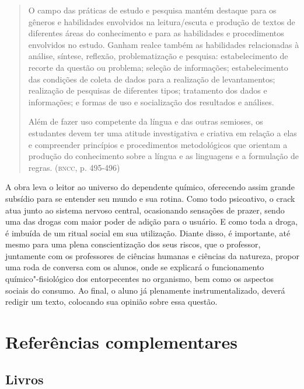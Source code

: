 \documentclass{article}
\begin{document}
\begin{quote}
O campo das práticas de estudo e pesquisa mantém destaque para os
gêneros e habilidades envolvidos na leitura/escuta e produção de textos
de diferentes áreas do conhecimento e para as habilidades e
procedimentos envolvidos no estudo. Ganham realce também as habilidades
relacionadas à análise, síntese, reflexão, problematização e pesquisa:
estabelecimento de recorte da questão ou problema; seleção de
informações; estabelecimento das condições de coleta de dados para a
realização de levantamentos; realização de pesquisas de diferentes
tipos; tratamento dos dados e informações; e formas de uso e
socialização dos resultados e análises.

Além de fazer uso competente da língua e das outras semioses, os
estudantes devem ter uma atitude investigativa e criativa em relação a
elas e compreender princípios e procedimentos metodológicos que orientam
a produção do conhecimento sobre a língua e as linguagens e a formulação
de regras. (\textsc{bncc}, p. 495-496)
\end{quote}

A obra leva o leitor ao universo do dependente químico, oferecendo
assim grande subsídio para se entender seu mundo e sua rotina. Como
todo psicoativo, o crack atua junto ao sistema nervoso central,
ocasionando sensações de prazer, sendo uma das drogas com maior poder
de adição para o usuário. E como toda a droga, é imbuída de um ritual
social em sua utilização. Diante disso, é importante, até mesmo para
uma plena conscientização dos seus riscos, que o professor, juntamente
com os professores de ciências humanas e ciências da natureza, propor
uma roda de conversa com os alunos, onde se explicará o funcionamento
químico"-fisiológico dos entorpecentes no organismo, bem como os
aspectos sociais do consumo. Ao final, o aluno já plenamente
instrumentalizado, deverá redigir um texto, colocando sua opinião
sobre essa questão.

\section{Referências complementares}

\subsection{Livros}
\end{document}
